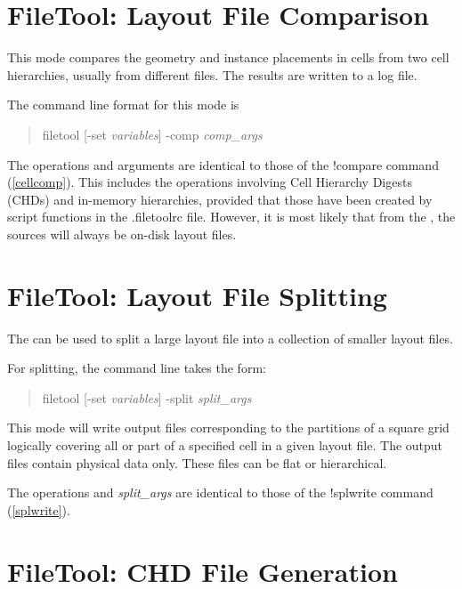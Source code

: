 \section{FileTool:  Layout File Comparison}

This mode compares the geometry and instance placements in cells from
two cell hierarchies, usually from different files.  The results are
written to a log file.

The command line format for this mode is
\begin{quote}
{\vt filetool} [{\vt -set} {\it variables\/}] {\vt -comp}
 {\it comp\_args}
\end{quote}

The operations and arguments are identical to those of the {\Xic} {\cb
!compare} command (\ref{cellcomp}).  This includes the operations
involving Cell Hierarchy Digests (CHDs) and in-memory hierarchies,
provided that those have been created by script functions in the {\vt
.filetoolrc} file.  However, it is most likely that from the
{\FileTool}, the sources will always be on-disk layout files.

\section{FileTool:  Layout File Splitting}

The {\FileTool} can be used to split a large layout file into a
collection of smaller layout files.

For splitting, the command line takes the form:
\begin{quote}
{\vt filetool} [{\vt -set} {\it variables\/}] {\vt -split}
  {\it split\_args}
\end{quote}

This mode will write output files corresponding to the partitions of
a square grid logically covering all or part of a specified cell in a
given layout file.  The output files contain physical data only. 
These files can be flat or hierarchical.

The operations and {\it split\_args} are identical to those of the
{\Xic} {\cb !splwrite} command (\ref{splwrite}).

\section{FileTool:  CHD File Generation}

